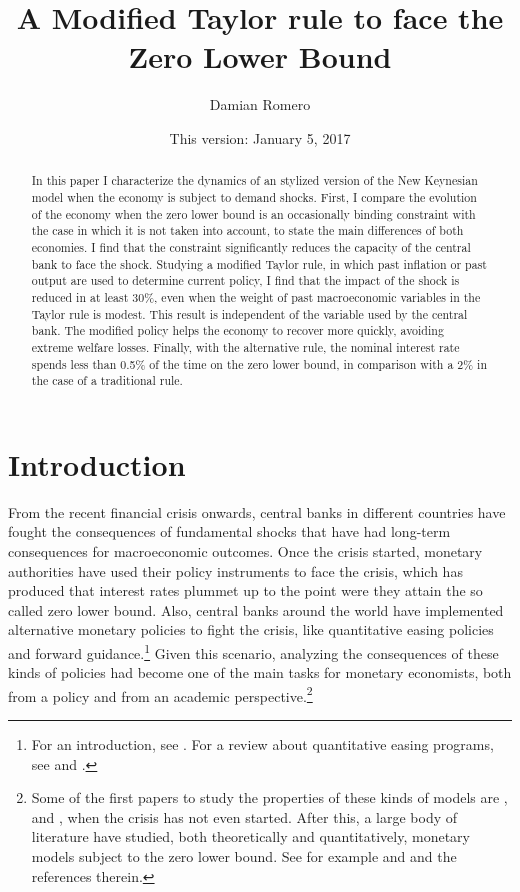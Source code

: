 \documentclass[12pt]{article}
\title{A Modified Taylor rule to face the Zero Lower Bound}
\author{Damian Romero}
\date{This version: January 5, 2017}
\numberwithin{equation}{section}
\begin{document}
	
\maketitle

\begin{abstract}
	\noindent In this paper I characterize the dynamics of an stylized version of the New Keynesian model when the economy is subject to demand shocks. First, I compare the evolution of the economy when the zero lower bound is an occasionally binding constraint with the case in which it is not taken into account, to state the main differences of both economies. I find that the constraint significantly reduces the capacity of the central bank to face the shock. Studying a modified Taylor rule, in which past inflation or past output are used to determine current policy, I find that the impact of the shock is reduced in at least 30\%, even when the weight of past macroeconomic variables in the Taylor rule is modest. This result is independent of the variable used by the central bank. The modified policy helps the economy to recover more quickly, avoiding extreme welfare losses. Finally, with the alternative rule, the nominal interest rate spends less than 0.5\% of the time on the zero lower bound, in comparison with a 2\% in the case of a traditional rule.
\end{abstract}	
	
\section{Introduction}\label{sec:introduction}

From the recent financial crisis onwards, central banks in different countries have fought the consequences of fundamental shocks that have had long-term consequences for macroeconomic outcomes. Once the crisis started, monetary authorities have used their policy instruments to face the crisis, which has produced that interest rates plummet up to the point were they attain the so called zero lower bound. Also, central banks around the world have implemented alternative monetary policies to fight the crisis, like quantitative easing policies and forward guidance.\footnote{For an introduction, see \cite{BorioEtAl2016}. For a review about quantitative easing programs, see \cite{ChenEtAl2012} and \cite{JoyceEtAl2012}.} Given this scenario, analyzing the consequences of these kinds of policies had become one of the main tasks for monetary economists, both from a policy and from an academic perspective.\footnote{Some of the first papers to study the properties of these kinds of models are \cite{BenhabibEtAl2001,BenhabibEtAl2001a,BenhabibEtAl2002}, \cite{EggertssonEtAl2003} and \cite{AdamEtAl2007}, when the crisis has not even started. After this, a large body of literature have studied, both theoretically and quantitatively, monetary models subject to the zero lower bound. See for example \cite{Fernandez-VillaverdeEtAl2015} and \cite{AruobaEtAl2016} and the references therein.}
\end{document}
